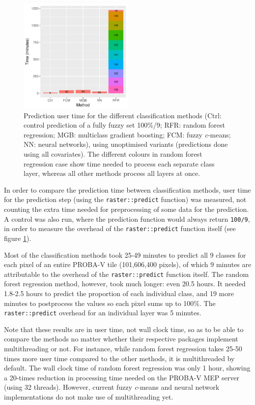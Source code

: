 \documentclass[a4paper,12pt]{scrbook}
\begin{document}
\begin{figure}
  \centering
  \includegraphics[width=0.5\textwidth]{thesis-figures/timing}
  \caption{Prediction user time for the different classification methods (Ctrl: control prediction of a fully fuzzy set 100\%/9; RFR: random forest regression; MGB: multiclass gradient boosting; FCM: fuzzy \textit{c}-means; NN: neural networks), using unoptimised variants (predictions done using all covariates). The different colours in random forest regression case show time needed to process each separate class layer, whereas all other methods process all layers at once.}
  \label{fig-timing}
\end{figure}

In order to compare the prediction time between classification methods, user time for the prediction step (using the \texttt{raster::predict} function) was measured, not counting the extra time needed for preprocessing of some data for the prediction. A control was also run, where the prediction function would always return \texttt{100/9}, in order to measure the overhead of the \texttt{raster::predict} function itself (see figure \ref{fig-timing}).

Most of the classification methods took 25-49 minutes to predict all 9 classes for each pixel of an entire PROBA-V tile (101,606,400 pixels), of which 9 minutes are attributable to the overhead of the \texttt{raster::predict} function itself. The random forest regression method, however, took much longer: even 20.5 hours. It needed 1.8-2.5 hours to predict the proportion of each individual class, and 19 more minutes to postprocess the values so each pixel sums up to 100\%. The \texttt{raster::predict} overhead for an individual layer was 5 minutes.

Note that these results are in user time, not wall clock time, so as to be able to compare the methods no matter whether their respective packages implement multithreading or not. For instance, while random forest regression takes 25-50 times more user time compared to the other methods, it is multithreaded by default. The wall clock time of random forest regression was only 1 hour, showing a 20-times reduction in processing time needed on the PROBA-V MEP server (using 32 threads). However, current fuzzy \textit{c}-means and neural network implementations do not make use of multithreading yet.
\end{document}
